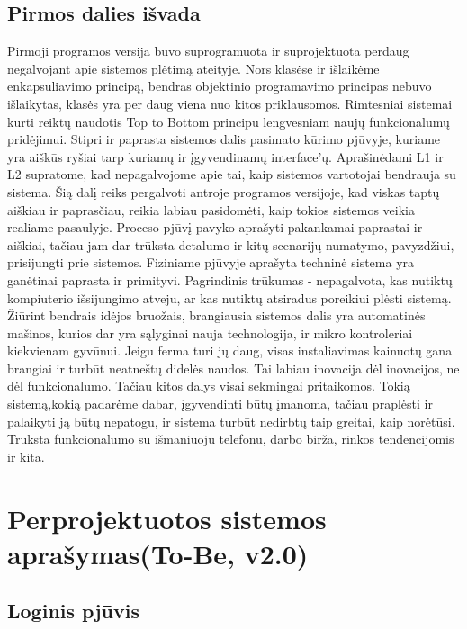 \documentclass[oneside]{VUMIFPSkursinis}
\begin{document}
\subsection{Pirmos dalies išvada}
Pirmoji programos versija buvo suprogramuota ir suprojektuota perdaug negalvojant apie sistemos plėtimą ateityje. Nors klasėse ir išlaikėme enkapsuliavimo principą, bendras objektinio programavimo principas nebuvo išlaikytas, klasės yra per daug viena nuo kitos priklausomos. Rimtesniai sistemai kurti reiktų naudotis Top to Bottom principu lengvesniam naujų funkcionalumų pridėjimui. Stipri ir paprasta sistemos dalis pasimato kūrimo pjūvyje, kuriame yra aiškūs ryšiai tarp kuriamų ir įgyvendinamų interface'ų. Aprašinėdami L1 ir L2 supratome, kad nepagalvojome apie tai, kaip sistemos vartotojai bendrauja su sistema. Šią dalį reiks pergalvoti antroje programos versijoje, kad viskas taptų aiškiau ir paprasčiau, reikia labiau pasidomėti, kaip tokios sistemos veikia realiame pasaulyje. Proceso pjūvį pavyko aprašyti pakankamai paprastai ir aiškiai, tačiau jam dar trūksta detalumo ir kitų scenarijų numatymo, pavyzdžiui, prisijungti prie sistemos. Fiziniame pjūvyje aprašyta techninė sistema yra ganėtinai paprasta ir primityvi. Pagrindinis trūkumas - nepagalvota, kas nutiktų kompiuterio išsijungimo atveju, ar kas nutiktų atsiradus poreikiui plėsti sistemą. Žiūrint bendrais idėjos bruožais, brangiausia sistemos dalis yra automatinės mašinos, kurios dar yra sąlyginai nauja technologija, ir mikro kontroleriai kiekvienam gyvūnui. Jeigu ferma turi jų daug, visas instaliavimas kainuotų gana brangiai ir turbūt neatneštų didelės naudos. Tai labiau inovacija dėl inovacijos, ne dėl funkcionalumo. Tačiau kitos dalys visai sekmingai pritaikomos. Tokią sistemą,kokią padarėme dabar, įgyvendinti būtų įmanoma, tačiau praplėsti ir palaikyti ją būtų nepatogu, ir sistema turbūt nedirbtų taip greitai, kaip norėtūsi. Trūksta funkcionalumo su išmaniuoju telefonu, darbo birža, rinkos tendencijomis ir kita. 

\pagebreak

\section{Perprojektuotos sistemos aprašymas(To-Be, v2.0)}

\subsection{Loginis pjūvis}
\end{document}
